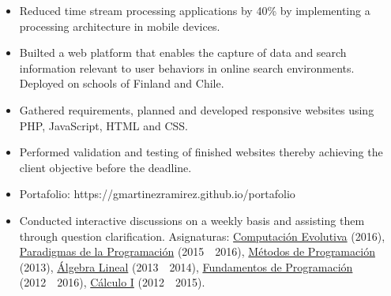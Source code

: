 \documentclass[]{cv-format}
\begin{document}
	\vspace{\separationAfterHeaderBeforeItem}
	\begin{itemize}[noitemsep,topsep=0pt]
			\begin{itemize}[label=\textbullet,noitemsep,topsep=0pt]
				\item Reduced time stream processing applications by 40\% by implementing a processing architecture in mobile devices.
				\item Builted a web platform that enables the capture of data and search information relevant to user behaviors in online search environments. Deployed on schools of Finland and Chile.
			\end{itemize}

		\vspace{\separationBetweenItems}

			\begin{itemize}[label=\textbullet,noitemsep,topsep=0pt]
				\item Gathered requirements, planned and developed responsive websites using PHP, JavaScript, HTML and CSS.
				\item Performed validation and testing of finished websites thereby achieving the client objective before the deadline.
				\item Portafolio: https://gmartinezramirez.github.io/portafolio
			\end{itemize}
		
		\vspace{\separationBetweenItems}
			\begin{itemize}[label=\textbullet]
				\itemsep0em
				\item Conducted interactive discussions on a weekly basis and assisting them through question clarification. Asignaturas: \ul{Computaci\'on Evolutiva} (2016), \ul{Paradigmas de la Programaci\'on} (2015\ \textendash \ 2016), \ul{M\'etodos de Programaci\'on} (2013), \ul{\'Algebra Lineal} (2013\ \textendash \ 2014), \ul{Fundamentos de Programaci\'on} (2012\ \textendash \ 2016), \ul{C\'alculo I} (2012\ \textendash \ 2015).
			\end{itemize}
	\end{itemize}
\end{document}
